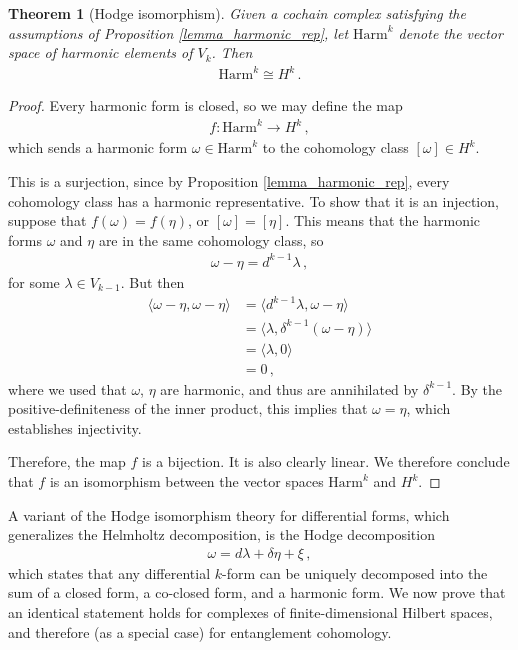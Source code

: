 \documentclass[12pt]{article}
\newtheorem{thm}{Theorem}[section]
\numberwithin{equation}{section}
\begin{document}
\begin{thm}[Hodge isomorphism]\label{bijection}
Given a cochain complex satisfying the assumptions of Proposition \ref{lemma_harmonic_rep}, let $\mathrm{Harm}^k$ denote the vector space of harmonic elements of $V_k$. Then
%
\begin{align}
    \mathrm{Harm}^k \cong H^k \, .
\end{align}
%
\end{thm}


\begin{proof}
    Every harmonic form is closed, so we may define the map
    \begin{align}
        f : \mathrm{Harm}^k \to H^k \, ,
    \end{align}
    which sends a harmonic form $\omega \in \mathrm{Harm}^k$ to the cohomology class $[\omega] \in H^k$.
    
    This is a surjection, since by Proposition \ref{lemma_harmonic_rep}, every cohomology class has a harmonic representative. To show that it is an injection,  suppose that $f ( \omega ) = f ( \eta )$, or $[ \omega ] = [ \eta ]$. This means that the harmonic forms $\omega$ and $\eta$ are in the same cohomology class, so
    \begin{align}
        \omega - \eta = d^{k-1} \lambda \, ,
    \end{align}
    for some $\lambda \in V_{k-1}$. But then
    \begin{align}
        \langle\omega-\eta , \omega-\eta\rangle &= \langle d^{k-1} \lambda, \omega-\eta\rangle \nonumber \\
        & =\langle\lambda, \delta^{k-1} (\omega-\eta)\rangle \nonumber \\
        & =\langle\lambda , 0\rangle \nonumber \\
        &=0 \, ,
    \end{align}
    where we used that $\omega$, $\eta$ are harmonic, and thus are annihilated by $\delta^{k-1}$. By the positive-definiteness of the inner product, this implies that $\omega = \eta$, which establishes injectivity.

    Therefore, the map $f$ is a bijection. It is also clearly linear. We therefore conclude that $f$ is an isomorphism between the vector spaces $\mathrm{Harm}^k$ and $H^k$.    
\end{proof}
%
A variant of the Hodge isomorphism theory for differential forms, which generalizes the Helmholtz decomposition, is the Hodge decomposition
%
\begin{align}
    \omega = d \lambda + \delta \eta + \xi \, ,
\end{align}
%
which states that any differential $k$-form can be uniquely decomposed into the sum of a closed form, a co-closed form, and a harmonic form. We now prove that an identical statement holds for complexes of finite-dimensional Hilbert spaces, and therefore (as a special case) for entanglement cohomology.
\end{document}
